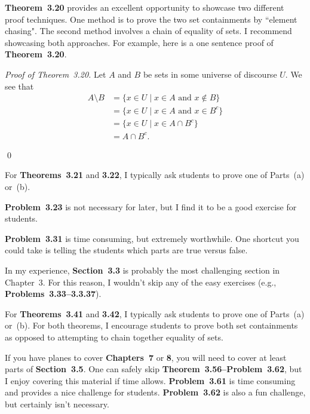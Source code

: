 \documentclass[11pt]{article}%
\newcommand{\blankline}{\pagebreak[2]\vspace{.5\baselineskip}}
\begin{document}
\textbf{Theorem~3.20} provides an excellent opportunity to showcase two different proof techniques.  One method is to prove the two set containments by ``element chasing".  The second method involves a chain of equality of sets.  I recommend showcasing both approaches.  For example, here is a one sentence proof of \textbf{Theorem~3.20}.

\blankline

\emph{Proof of Theorem~3.20.} Let $A$ and $B$ be sets in some universe of discourse $U$. We see that
\begin{align*}
A\setminus B & = \{x\in U\mid x\in A \text{ and } x\notin B\}\\
& = \{x\in U\mid x\in A \text{ and } x\in B^c\}\\
& = \{x\in U\mid x\in A \cap B^c\}\\
& = A\cap B^c. 
\end{align*}
\vspace{-2em}
 
\qed

\blankline

For \textbf{Theorems~3.21} and \textbf{3.22}, I typically ask students to prove one of Parts~(a) or~(b).

\blankline

\textbf{Problem~3.23} is not necessary for later, but I find it to be a good exercise for students.

\blankline

\textbf{Problem~3.31} is time consuming, but extremely worthwhile.  One shortcut you could take is telling the students which parts are true versus false.

\blankline

In my experience, \textbf{Section~3.3} is probably the most challenging section in Chapter~3.  For this reason, I wouldn't skip any of the easy exercises (e.g., \textbf{Problems~3.33--3.3.37}).  

\blankline

For \textbf{Theorems~3.41} and \textbf{3.42}, I typically ask students to prove one of Parts~(a) or~(b).  For both theorems, I encourage students to prove both set containments as opposed to attempting to chain together equality of sets.

\blankline

If you have planes to cover \textbf{Chapters~7} or \textbf{8}, you will need to cover at least parts of \textbf{Section~3.5}.  One can safely skip \textbf{Theorem~3.56--Problem~3.62}, but I enjoy covering this material if time allows. \textbf{Problem~3.61} is time consuming and provides a nice challenge for students.  \textbf{Problem~3.62} is also a fun challenge, but certainly isn't necessary.
\end{document}
